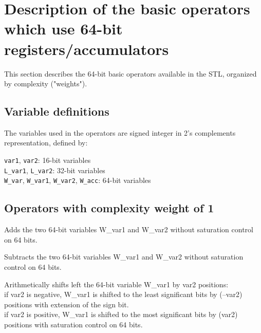 \section{Description of the basic operators which use 64-bit registers/accumulators}

This section describes the 64-bit basic operators available in the STL, organized by complexity ("weights").

\subsection{Variable definitions}

The variables used in the operators are signed integer in 2's complements representation, defined by:

{\tt var1}, {\tt var2}: 16-bit variables\\
{\tt L\_var1}, {\tt L\_var2}: 32-bit variables\\
{\tt W\_var}, {\tt W\_var1}, {\tt W\_var2}, {\tt W\_acc}: 64-bit variables


\subsection{Operators with complexity weight of 1}


Adds the two 64-bit variables W\_var1 and W\_var2 without saturation control on 64 bits.


Subtracts the two 64-bit variables W\_var1 and W\_var2 without saturation control on 64 bits.



Arithmetically shifts left the 64-bit variable W\_var1 by var2 positions:\\
if var2 is negative, W\_var1 is shifted to the least significant bits by (–var2) positions with extension of the sign bit.\\
if var2 is positive, W\_var1 is shifted to the most significant bits by (var2) positions with saturation control on 64 bits.



